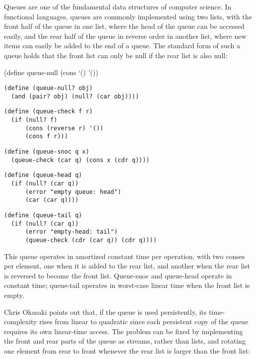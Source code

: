 Queues are one of the fundamental data structures of computer science.
In functional languages, queues are commonly implemented using two
lists, with the front half of the queue in one list, where the head of
the queue can be accessed easily, and the rear half of the queue in
reverse order in another list, where new items can easily be added to
the end of a queue. The standard form of such a queue holds that the
front list can only be null if the rear list is also null:

(define queue-null (cons `() '())

\begin{verbatim}
(define (queue-null? obj)
  (and (pair? obj) (null? (car obj))))
\end{verbatim}

\begin{verbatim}
(define (queue-check f r)
  (if (null? f)
      (cons (reverse r) '())
      (cons f r)))
\end{verbatim}

\begin{verbatim}
(define (queue-snoc q x)
  (queue-check (car q) (cons x (cdr q))))
\end{verbatim}

\begin{verbatim}
(define (queue-head q)
  (if (null? (car q))
      (error "empty queue: head")
      (car (car q))))
\end{verbatim}

\begin{verbatim}
(define (queue-tail q)
  (if (null? (car q))
      (error "empty-head: tail")
      (queue-check (cdr (car q)) (cdr q))))
\end{verbatim}

This queue operates in amortized constant time per operation, with two
conses per element, one when it is added to the rear list, and another
when the rear list is reversed to become the front list. Queue-snoc and
queue-head operate in constant time; queue-tail operates in worst-case
linear time when the front list is empty.

Chris Okasaki points out that, if the queue is used persistently, its
time-complexity rises from linear to quadratic since each persistent
copy of the queue requires its own linear-time access. The problem can
be fixed by implementing the front and rear parts of the queue as
streams, rather than lists, and rotating one element from rear to front
whenever the rear list is larger than the front list:

